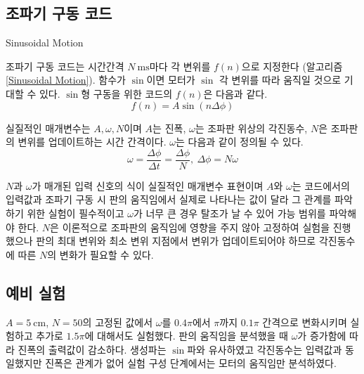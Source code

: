 \subsection{조파기 구동 코드}

\begin{algorithm}[h]
    \caption{Sinusoidal Motion}
    \label{Sinusoidal Motion}
    \begin{algorithmic}[1]
            \EndIf
        \EndFor
        \EndProcedure
    \end{algorithmic}
\end{algorithm}

조파기 구동 코드는 시간간격 $N~\mathrm{ms}$마다 각 변위를 $f(n)$으로 지정한다 (알고리즘 \ref{Sinusoidal Motion}). 함수가 $\sin$이면 모터가 $\sin$ 각 변위를 따라 움직일 것으로 기대할 수 있다. $\sin$형 구동을 위한 코드의 $f(n)$은 다음과 같다.
\begin{equation}
    f(n) = A \sin(n \Delta\phi)
    \label{f(n)}
\end{equation}

실질적인 매개변수는 $A, \omega, N$이며 $A$는 진폭, $\omega$는 조파판 위상의 각진동수, $N$은 조파판의 변위를 업데이트하는 시간 간격이다. $\omega$는 다음과 같이 정의될 수 있다.
\begin{equation}
    \omega = \frac{\Delta\phi}{\Delta t} = \frac{\Delta\phi}{N}, ~\Delta\phi = N \omega
    \label{f(N)}
\end{equation}

$N$과 $\omega$가 매개된 입력 신호의 식이 실질적인 매개변수 표현이며 $A$와 $\omega$는 코드에서의 입력값과 조파기 구동 시 판의 움직임에서 실제로 나타나는 값이 달라 그 관계를 파악하기 위한 실험이 필수적이고 $\omega$가 너무 큰 경우 탈조가 날 수 있어 가능 범위를 파악해야 한다. $N$은 이론적으로 조파판의 움직임에 영향을 주지 않아 고정하여 실험을 진행했으나 판의 최대 변위와 최소 변위 지점에서 변위가 업데이트되어야 하므로 각진동수에 따른 $N$의 변화가 필요할 수 있다.

\subsection{예비 실험}
$A = 5\mathrm{~cm}$, $N=50$의 고정된 값에서 $\omega$를 $0.4\pi$에서 $\pi$까지 $0.1\pi$ 간격으로 변화시키며 실험하고 추가로 $1.5\pi$에 대해서도 실험했다.
판의 움직임을 분석했을 때 $\omega$가 증가함에 따라 진폭의 출력값이 감소하다. 생성파는 $\sin$파와 유사하였고 각진동수는 입력값과 동일했지만 진폭은 관계가 없어 실험 구성 단계에서는 모터의 움직임만 분석하였다.


